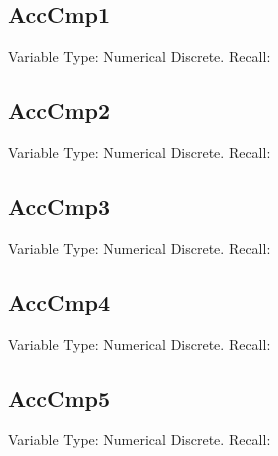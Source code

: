 \subsection{AccCmp1}
Variable Type: Numerical Discrete.\newline
Recall: 
\subsection{AccCmp2}
Variable Type: Numerical Discrete.\newline
Recall: 
\subsection{AccCmp3}
Variable Type: Numerical Discrete.\newline
Recall: 
\subsection{AccCmp4}
Variable Type: Numerical Discrete.\newline
Recall: 
\subsection{AccCmp5}
Variable Type: Numerical Discrete.\newline
Recall: 
